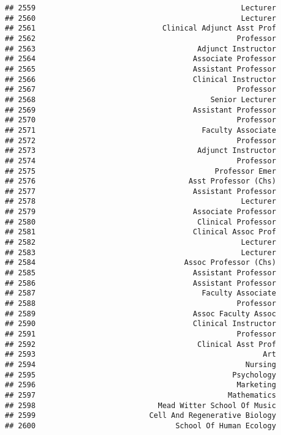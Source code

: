 \documentclass[
]{article}
\begin{document}
\begin{verbatim}
## 2559                                               Lecturer
## 2560                                               Lecturer
## 2561                             Clinical Adjunct Asst Prof
## 2562                                              Professor
## 2563                                     Adjunct Instructor
## 2564                                    Associate Professor
## 2565                                    Assistant Professor
## 2566                                    Clinical Instructor
## 2567                                              Professor
## 2568                                        Senior Lecturer
## 2569                                    Assistant Professor
## 2570                                              Professor
## 2571                                      Faculty Associate
## 2572                                              Professor
## 2573                                     Adjunct Instructor
## 2574                                              Professor
## 2575                                         Professor Emer
## 2576                                   Asst Professor (Chs)
## 2577                                    Assistant Professor
## 2578                                               Lecturer
## 2579                                    Associate Professor
## 2580                                     Clinical Professor
## 2581                                    Clinical Assoc Prof
## 2582                                               Lecturer
## 2583                                               Lecturer
## 2584                                  Assoc Professor (Chs)
## 2585                                    Assistant Professor
## 2586                                    Assistant Professor
## 2587                                      Faculty Associate
## 2588                                              Professor
## 2589                                    Assoc Faculty Assoc
## 2590                                    Clinical Instructor
## 2591                                              Professor
## 2592                                     Clinical Asst Prof
## 2593                                                    Art
## 2594                                                Nursing
## 2595                                             Psychology
## 2596                                              Marketing
## 2597                                            Mathematics
## 2598                            Mead Witter School Of Music
## 2599                          Cell And Regenerative Biology
## 2600                                School Of Human Ecology

\end{verbatim}
\end{document}
